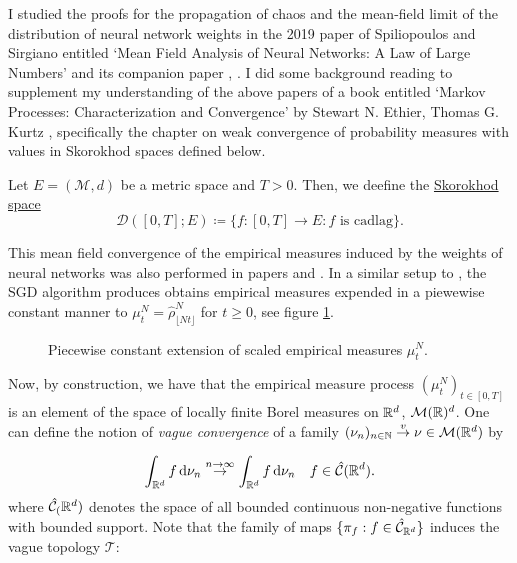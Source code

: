 \documentclass{article}
\begin{document}
I studied the proofs for the propagation of chaos and the mean-field limit of the distribution of neural network weights in the 2019 paper of Spiliopoulos and Sirgiano entitled ‘Mean Field Analysis of Neural Networks: A Law of Large Numbers’ and its companion paper \cite{sirignano2019meanfieldanalysislln}, \cite{sirignano2019meanfieldanalysisclt}. I did some background reading to supplement my understanding of the above papers of a book entitled ‘Markov Processes: Characterization and Convergence’ by Stewart N. Ethier, Thomas G. Kurtz \cite{ethier2009markov}, specifically the chapter on weak convergence of probability measures with values in Skorokhod spaces defined below.

\begin{boxdef}\label{def: skorokhod}
	Let $  E = (\mathcal{M}, d)$ be a metric space and $ T>0$. Then, we deefine the \underline{Skorokhod space} 
\begin{equation}
	\mathcal{D}([0,T]; E) \coloneqq \{f:[0,T]\to E: f \text{ is cadlag}\}.
\end{equation}

\end{boxdef}

This mean field convergence of the empirical measures induced by the weights of neural networks was also performed in papers \cite{sirignano2019meanfieldanalysisclt} and \cite{sirignano2019meanfieldanalysislln}. In a similar setup to \cite{Mei_2018}, the SGD algorithm produces obtains empirical measures expended in a piewewise constant manner to $\mu^{N}_{t} = \hat{\rho}^{N}_{\lfloor Nt \rfloor}$ for $ t\geq 0$, see figure \ref{fig: piecewise constant extension of function}. 
\begin{figure}[H]
    \centering
    
    \caption{Piecewise constant extension of scaled empirical measures $ \mu^{N}_{t}$.}
    \label{fig: piecewise constant extension of function}
\end{figure}

Now, by construction, we have that the empirical measure process $ (\mu^{N}_{t})_{t\in [0,T]}$ is an element of the space of locally finite Borel measures on $ \mathbb{R}^{d}$, $ \mathcal{M}(\mathbb{R})^{d}$. One can define the notion of \textit{vague convergence} of a family $ (\nu_{n})_{n\in \mathbb{N}} \stackrel{v}{\to} \nu\in \mathcal{M}(\mathbb{R}^{d})$ by 

\begin{equation}\label{eq: vague conv}
	\int_{\mathbb{R}^{d}}f \operatorname{d}\! \nu_{n}\stackrel{n\to \infty}{\to} \int_{\mathbb{R}^{d}}f \operatorname{d}\! \nu_{n} \quad  f\in \hat{\mathcal{C}}(\mathbb{R}^{d}).
\end{equation}
where $ \hat{\mathcal{C}}_(\mathbb{R}^{d})$ denotes the space of all bounded continuous non-negative functions with bounded support. Note that the family of maps $\{\pi_{f}:f\in \hat {\mathcal{C}}_{\mathbb{R}^{d}}\} $ induces the vague topology $ \mathcal{T}$: 
\end{document}
